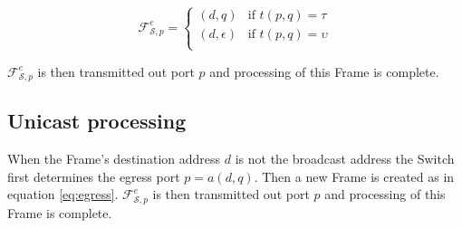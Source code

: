 \documentclass{article}
\begin{document}
\begin{equation}\label{eq:egress}
\mathcal{F}_{\mathcal{S}, p}^{e} =
\left\{
  \begin{array}{ll}
     (d,q) & \mbox{if } t(p, q) = \tau \\
     (d, \epsilon) & \mbox{if } t(p, q) = \upsilon\\
  \end{array}
\right.
\end{equation}


\( \mathcal{F}_{\mathcal{S}, p}^{e} \)
is then transmitted out port \(p\) and processing of this Frame is complete.

\subsection{Unicast processing}

When the Frame's destination address \(d\) is not the broadcast address the Switch first determines the egress port \(p = a(d, q)\). Then a new Frame is created as in equation \ref{eq:egress}. \( \mathcal{F}_{\mathcal{S}, p}^{e} \)
is then transmitted out port \(p\) and processing of this Frame is complete.
\end{document}
